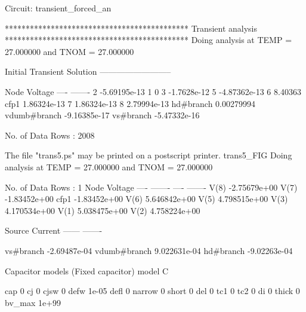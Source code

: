 
Circuit: transient_forced_an

********************************************
Transient analysis
********************************************
Doing analysis at TEMP = 27.000000 and TNOM = 27.000000


Initial Transient Solution
--------------------------

Node                                   Voltage
----                                   -------
2                                 -5.69195e-13
1                                            0
3                                  -1.7628e-12
5                                 -4.87362e-13
6                                      8.40363
cfp1                               1.86324e-13
7                                  1.86324e-13
8                                  2.79994e-13
hd#branch                           0.00279994
vdumb#branch                      -9.16385e-17
vs#branch                         -5.47332e-16


No. of Data Rows : 2008

The file "trans5.ps" may be printed on a postscript printer.
trans5_FIG
Doing analysis at TEMP = 27.000000 and TNOM = 27.000000


No. of Data Rows : 1
	Node                                  Voltage
	----                                  -------
	----	-------
	V(8)                             -2.75679e+00
	V(7)                             -1.83452e+00
	cfp1                             -1.83452e+00
	V(6)                             5.646842e+00
	V(5)                             4.798515e+00
	V(3)                             4.170534e+00
	V(1)                             5.038475e+00
	V(2)                             4.758224e+00

	Source	Current
	------	-------

	vs#branch                        -2.69487e-04
	vdumb#branch                     9.022631e-04
	hd#branch                        -9.02263e-04

 Capacitor models (Fixed capacitor)
      model                     C

        cap                     0
         cj                     0
       cjsw                     0
       defw                 1e-05
       defl                     0
     narrow                     0
      short                     0
        del                     0
        tc1                     0
        tc2                     0
         di                     0
      thick                     0
     bv_max                 1e+99

